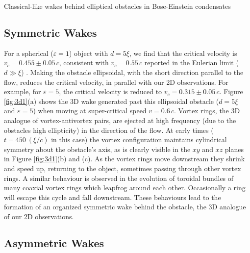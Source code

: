 \begin{chapter}{\label{cha:wake}Classical-like wakes behind elliptical obstacles in Bose-Einstein condensates}
\subsection{Symmetric Wakes} 
For a spherical ($\varepsilon=1$) object with $d=5\xi$, we find that the critical velocity is $v_c=0.455\pm 0.05\,c$, consistent with $v_c=0.55\,c$ reported in the Eulerian limit ($d \gg \xi$) \cite{win01,winiecki99}.  Making the obstacle ellipsoidal, with the short direction parallel to the flow, reduces the critical velocity, in parallel with our 2D observations.  For example, for $\varepsilon=5$, the critical velocity is reduced to $v_c=0.315 \pm 0.05\,c$.  Figure \ref{fig:3d1}(a) shows the 3D wake generated past this ellipsoidal obstacle ($d=5\xi$ and $\varepsilon = 5$) when moving at super-critical speed $v=0.6\,c$.  Vortex rings, the 3D analogue of vortex-antivortex pairs, are ejected at high frequency (due to the obstacles high ellipticity) in the direction of the flow.  At early times ($t=450~(\xi/c)$ in this case) the vortex configuration maintains cylindrical symmetry about the obstacle's axis, as is clearly visible in the $xy$ and $xz$ planes in Figure \ref{fig:3d1}(b) and (c).  As the vortex rings move downstream they shrink and speed up, returning to the object, sometimes passing through other vortex rings. A similar behaviour is observed \cite{wacks} in the evolution of toroidal bundles of many coaxial vortex rings which leapfrog around each other.  Occasionally a ring will escape this cycle and fall downstream.  These behaviours lead to the formation of an organized symmetric wake behind the obstacle,  the 3D analogue of our 2D observations.  


\subsection{Asymmetric Wakes}


\end{chapter}
